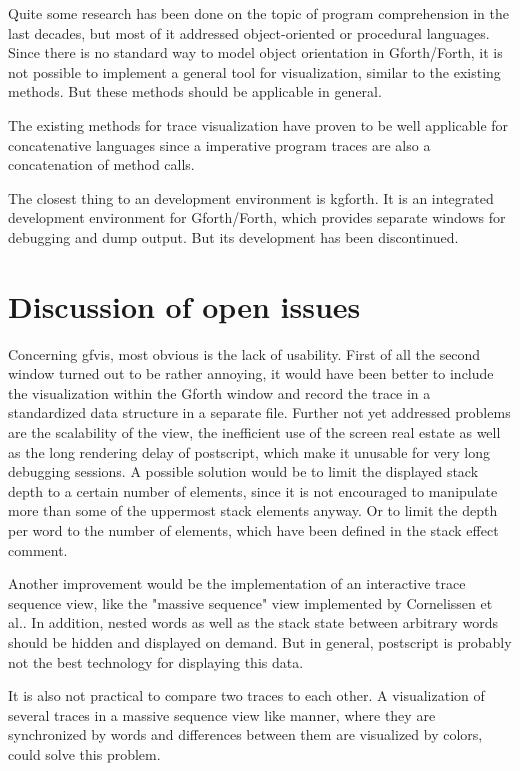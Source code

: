 Quite some research has been done on the topic of program comprehension in the last decades, but most of it addressed object-oriented or procedural languages. Since there is no standard way to model object orientation in Gforth/Forth, it is not possible to implement a general tool for visualization, similar to the existing methods. But these methods should be applicable in general.

The existing methods for trace visualization have proven to be well applicable for concatenative languages since a imperative program traces are also a concatenation of method calls.

The closest thing to an development environment is kgforth. It is an integrated development environment for Gforth/Forth, which provides separate windows for debugging and dump output. But its development has been discontinued.

\section{Discussion of open issues}

Concerning gfvis, most obvious is the lack of usability. First of all the second window turned out to be rather annoying, it would have been better to include the visualization within the Gforth window and record the trace in a standardized data structure in a separate file.
Further not yet addressed problems are the scalability of the view, the inefficient use of the screen real estate as well as the long rendering delay of postscript, which make it unusable for very long debugging sessions. A possible solution would be to limit the displayed stack depth to a certain number of elements, since it is not encouraged to manipulate more than some of the uppermost stack elements anyway. Or to limit the depth per word to the number of elements, which have been defined in the stack effect comment.

Another improvement would be the implementation of an interactive trace sequence view, like the "massive sequence" view implemented by Cornelissen et al.\cite{Cornelissen:2008:ETA:1454787.1454981}. In addition, nested words as well as the stack state between arbitrary words should be hidden and displayed on demand. But in general, postscript is probably not the best technology for displaying this data.

It is also not practical to compare two traces to each other. A visualization of several traces in a massive sequence view like manner, where they are synchronized by words and differences between them are visualized by colors, could solve this problem.

